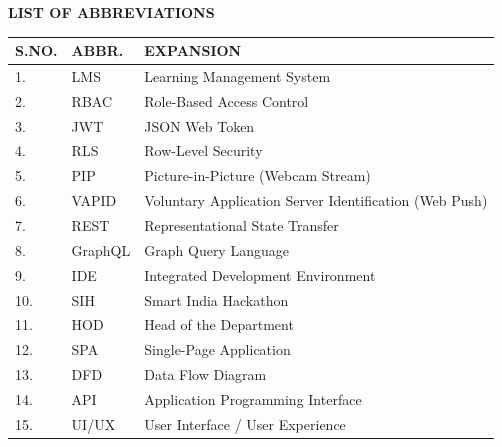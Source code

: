 \begin{center}
  {\fontsize{16pt}{20pt}\selectfont\bfseries LIST OF ABBREVIATIONS\par}
\end{center}
\vspace{0.6cm}

\begin{table}[H]
  \centering
  \fontsize{11.5pt}{17.5pt}\selectfont
  \begin{tabularx}{\textwidth}{@{}p{1.4cm} p{2.4cm} L@{}}
    \textbf{S.NO.} & \textbf{ABBR.} & \textbf{EXPANSION} \\
    . & LMS & Learning Management System \\
    2. & RBAC & Role-Based Access Control \\
    3. & JWT & JSON Web Token \\
    4. & RLS & Row-Level Security \\
    5. & PIP & Picture-in-Picture (Webcam Stream) \\
    6. & VAPID & Voluntary Application Server Identification (Web Push) \\
    7. & REST & Representational State Transfer \\
    8. & GraphQL & Graph Query Language \\
    9. & IDE & Integrated Development Environment \\
    10. & SIH & Smart India Hackathon \\
    11. & HOD & Head of the Department \\
    12. & SPA & Single-Page Application \\
    13. & DFD & Data Flow Diagram \\
    14. & API & Application Programming Interface \\
    15. & UI/UX & User Interface / User Experience \\
    \bottomrule
  \end{tabularx}
\end{table}
\newpage
